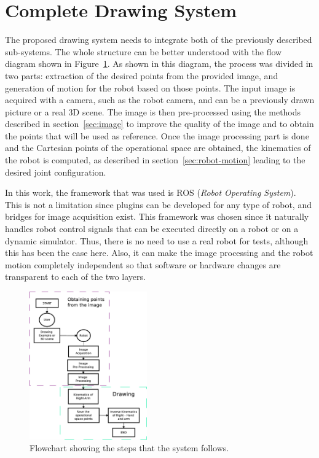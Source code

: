 \documentclass[conference]{IEEEtran}
\begin{document}
\section{Complete Drawing System}
\label{sec:drawing}

The proposed drawing system needs to integrate both of the previously described sub-systems.
The whole structure can be better understood with the flow diagram shown in Figure~\ref{f: flowchart}. As shown in this diagram, the process was divided in two parts: extraction of the desired points from the provided image, and generation of motion for the robot based on those points. The input image is acquired with a camera, such as the robot camera, and can be a previously drawn picture or a real 3D scene. The image is then pre-processed using the methods described in section~\ref{sec:image} to improve the quality of the image and to obtain the points that will be used as reference. Once the image processing part is done and the Cartesian points of the operational space are obtained, the kinematics of the robot is computed, as described in section~\ref{sec:robot-motion} leading to the desired joint configuration.

In this work, the framework that was used is ROS (\textit{Robot Operating System}). This is not a limitation since plugins can be developed for any type of robot, and bridges for image acquisition exist. This framework was chosen since it naturally handles robot control signals that can be executed directly on a robot or on a dynamic simulator. Thus, there is no need to use a real robot for tests, although this has been the case here. Also, it can make the image processing and the robot motion completely independent so that software or hardware changes are transparent to each of the two layers.

\begin{figure}
\centering
\captionsetup{font=footnotesize}
\includegraphics[width=0.45\textwidth]{flowchart.eps}
\caption{Flowchart showing the steps that the system follows.}
\label{f: flowchart}
\end{figure}
\end{document}
